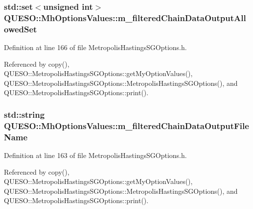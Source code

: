 \hypertarget{class_q_u_e_s_o_1_1_mh_options_values_ab465e2184857848c2276578b2b08baab}{
\subsubsection[{m\-\_\-filtered\-Chain\-Data\-Output\-Allowed\-Set}]{\setlength{\rightskip}{0pt plus 5cm}std\-::set$<$unsigned int$>$ Q\-U\-E\-S\-O\-::\-Mh\-Options\-Values\-::m\-\_\-filtered\-Chain\-Data\-Output\-Allowed\-Set}}\label{class_q_u_e_s_o_1_1_mh_options_values_ab465e2184857848c2276578b2b08baab}


Definition at line 166 of file Metropolis\-Hastings\-S\-G\-Options.\-h.



Referenced by copy(), Q\-U\-E\-S\-O\-::\-Metropolis\-Hastings\-S\-G\-Options\-::get\-My\-Option\-Values(), Q\-U\-E\-S\-O\-::\-Metropolis\-Hastings\-S\-G\-Options\-::\-Metropolis\-Hastings\-S\-G\-Options(), and Q\-U\-E\-S\-O\-::\-Metropolis\-Hastings\-S\-G\-Options\-::print().

\hypertarget{class_q_u_e_s_o_1_1_mh_options_values_a337b2f1161814f1c52153cbe7706f59a}{
\subsubsection[{m\-\_\-filtered\-Chain\-Data\-Output\-File\-Name}]{\setlength{\rightskip}{0pt plus 5cm}std\-::string Q\-U\-E\-S\-O\-::\-Mh\-Options\-Values\-::m\-\_\-filtered\-Chain\-Data\-Output\-File\-Name}}\label{class_q_u_e_s_o_1_1_mh_options_values_a337b2f1161814f1c52153cbe7706f59a}


Definition at line 163 of file Metropolis\-Hastings\-S\-G\-Options.\-h.



Referenced by copy(), Q\-U\-E\-S\-O\-::\-Metropolis\-Hastings\-S\-G\-Options\-::get\-My\-Option\-Values(), Q\-U\-E\-S\-O\-::\-Metropolis\-Hastings\-S\-G\-Options\-::\-Metropolis\-Hastings\-S\-G\-Options(), and Q\-U\-E\-S\-O\-::\-Metropolis\-Hastings\-S\-G\-Options\-::print().

